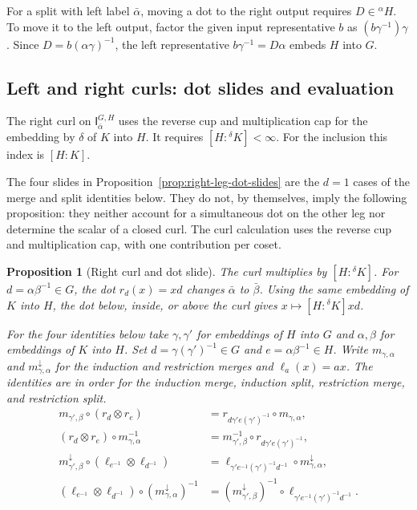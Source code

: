 \documentclass[11pt,a4paper]{article}
\numberwithin{equation}{section}
\newtheorem{proposition}[theorem]{Proposition}
\theoremstyle{definition}
\newcommand{\cg}[2]{{}^{#1}\!#2}
\newcommand{\I}{\mathsf I}
\begin{document}
For a split with left label \(\bar\alpha\), moving a dot to the
right output requires \(D\in\cg{\alpha}{H}\). To move it to the
left output, factor the given input representative \(b\) as
\((b\gamma^{-1})\gamma\). Since
\(D=b(\alpha\gamma)^{-1}\), the left representative
\(b\gamma^{-1}=D\alpha\) embeds \(H\) into \(G\).

\subsection{Left and right curls: dot slides and evaluation}

The right curl on \(\I_{\bar\alpha}^{G,H}\) uses the
reverse cup and multiplication cap for the embedding by \(\delta\)
of \(K\) into \(H\). It requires \([H:\cg{\delta}{K}]<\infty\).
For the inclusion this index is \([H:K]\).

The four slides in Proposition~\ref{prop:right-leg-dot-slides} are the
\(d=1\) cases of the merge and split identities below. They do not,
by themselves, imply the following proposition: they neither account
for a simultaneous dot on the other leg nor determine the scalar
of a closed curl. The curl calculation uses the reverse cup and
multiplication cap, with one contribution per coset.

\begin{proposition}[Right curl and dot slide]\label{prop:curl}
The curl multiplies by \([H:\cg{\delta}{K}]\).
For \(d=\alpha\beta^{-1}\in G\), the dot \(r_d(x)=xd\) changes
\(\bar\alpha\) to \(\bar\beta\). Using the same embedding of \(K\)
into \(H\), the dot below, inside, or above the curl gives
\(x\mapsto[H:\cg{\delta}{K}]xd\).

For the four identities below take \(\gamma,\gamma'\) for embeddings
of \(H\) into \(G\) and \(\alpha,\beta\) for embeddings of \(K\) into \(H\).
Set \(d=\gamma(\gamma')^{-1}\in G\) and \(e=\alpha\beta^{-1}\in H\).
Write \(m_{\gamma,\alpha}\) and \(m^\downarrow_{\gamma,\alpha}\) for the
induction and restriction merges and \(\ell_a(x)=ax\).
The identities are in order for the induction merge, induction split,
restriction merge, and restriction split.
\begin{align}
 m_{\gamma',\beta}\circ(r_d\otimes r_e)
  &=r_{d\gamma'e(\gamma')^{-1}}\circ m_{\gamma,\alpha},
       \label{eq:two-leg-slide}\\
 (r_d\otimes r_e)\circ m_{\gamma,\alpha}^{-1}
  &=m_{\gamma',\beta}^{-1}\circ r_{d\gamma'e(\gamma')^{-1}},\\
 m^\downarrow_{\gamma',\beta}\circ(\ell_{e^{-1}}\otimes\ell_{d^{-1}})
  &=\ell_{\gamma'e^{-1}(\gamma')^{-1}d^{-1}}\circ
        m^\downarrow_{\gamma,\alpha},\\
 (\ell_{e^{-1}}\otimes\ell_{d^{-1}})\circ(m^\downarrow_{\gamma,\alpha})^{-1}
  &=(m^\downarrow_{\gamma',\beta})^{-1}\circ
        \ell_{\gamma'e^{-1}(\gamma')^{-1}d^{-1}} .
\end{align}
\end{proposition}
\end{document}
